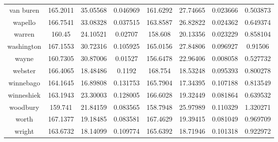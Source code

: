 \begin{table}[H]
\begin{tabular}{|c|ccc|ccc|c|}
van buren     & 165.2011 & 35.05568       & 0.046969 & 161.6292 & 27.74665       & 0.023666 & 0.503873 \\
wapello       & 166.7541 & 33.08328       & 0.037515 & 163.8587 & 26.82822       & 0.024362 & 0.649374 \\
warren        & 160.45   & 24.10521       & 0.02707  & 158.608  & 20.13356       & 0.023229 & 0.858104 \\
washington    & 167.1553 & 30.72316       & 0.105925 & 165.0156 & 27.84806       & 0.096927 & 0.91506  \\
wayne         & 160.7305 & 30.87006       & 0.01527  & 156.6478 & 22.96406       & 0.008058 & 0.527732 \\
webster       & 166.4065 & 18.48486       & 0.1192   & 168.754  & 18.53248       & 0.095393 & 0.800278 \\
winnebago     & 164.1645 & 16.89808       & 0.131753 & 165.7904 & 17.34395       & 0.107188 & 0.813549 \\
winneshiek    & 163.1943 & 23.30003       & 0.128005 & 166.6028 & 19.32449       & 0.081864 & 0.639532 \\
woodbury      & 159.741  & 21.84159       & 0.083565 & 158.7948 & 25.97989       & 0.110329 & 1.320271 \\
worth         & 167.1377 & 19.18485       & 0.083581 & 167.4629 & 19.39415       & 0.081049 & 0.969709 \\
wright        & 163.6732 & 18.14099       & 0.109774 & 165.6392 & 18.71946       & 0.101318 & 0.922972   \\
\hline
\end{tabular}
\end{table}

